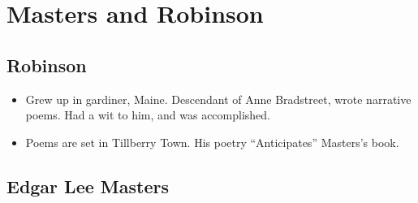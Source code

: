 \documentclass[10pt]{article}
\begin{document}
\section{Masters and Robinson}
\subsection{Robinson}
\begin{itemize}
	\item Grew up in gardiner, Maine.  Descendant of Anne 
		Bradstreet, wrote narrative poems.  Had a wit to him,
		and was accomplished.
	\item Poems are set in Tillberry Town.  His poetry
		``Anticipates'' Masters's book.
\end{itemize}
\subsection{Edgar Lee Masters}
\end{document}
